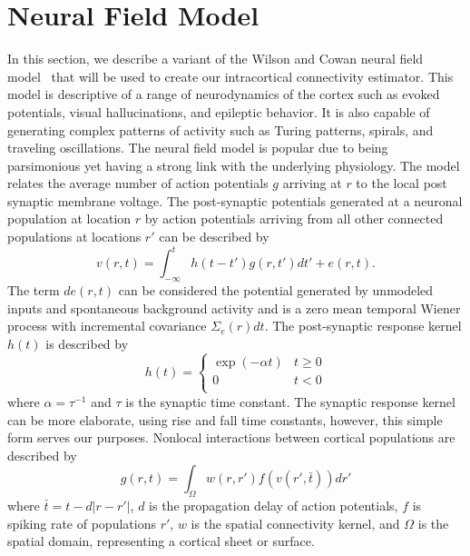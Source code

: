 \documentclass[onecolumn,draftcls]{IEEEtran}
\begin{document}
\section{Neural Field Model}
In this section, we describe a variant of the  Wilson and Cowan neural field model~\cite{Wilson1973} that will be used to create our intracortical connectivity estimator. This model is descriptive of a range of neurodynamics of the cortex such as evoked potentials, visual hallucinations, and epileptic behavior. It is also capable of generating complex patterns of activity such as Turing patterns, spirals, and traveling oscillations. The neural field model is popular due to being parsimonious yet having a strong link with the underlying physiology.
The model relates the average number of action potentials $g$ arriving at $r$ to the local post synaptic membrane voltage. The post-synaptic potentials generated at a neuronal population at location $r$ by action potentials arriving from all other connected populations at locations $r'$ can be described by
\begin{equation}\label{SpikesToPotential}
v\left( {r,t} \right) = \int_{ - \infty }^t {h\left( {t - t'} \right)g\left( {r,t'} \right)dt'} + e\left( {r,t} \right).
\end{equation}
The term $de(r,t)$ can be considered the potential generated by unmodeled inputs and spontaneous background activity and is a zero mean temporal Wiener process with incremental covariance $\Sigma_e(r)dt$. The post-synaptic response kernel $h(t)$ is described by
\begin{equation}\label{SynapticRespKernel}
h(t) = \left\{ {\begin{array}{*{20}{c}}
   {\exp ( - \alpha t)} & {t \ge 0}  \\
   0 & {t < 0}  \\
\end{array}} \right.
\end{equation}
where $\alpha=\tau^{-1}$ and $\tau$ is the synaptic time constant. The synaptic response kernel can be more elaborate, using rise and fall time constants, however, this simple form serves our purposes. Nonlocal interactions between cortical populations are described by	
\begin{equation}\label{RateBasedInteractions}
g\left( r,t \right) = \int_\Omega  {w\left( r,r' \right)f\left( v\left( r',\bar t \right) \right)dr'}
\end{equation}
where $\bar t = t - d\left| {r - r'} \right|$, $d$ is the propagation delay of action potentials, $f$ is spiking rate of populations $r'$, $w$ is the spatial connectivity kernel, and $\Omega$ is the spatial domain, representing a cortical sheet or surface.
\end{document}
